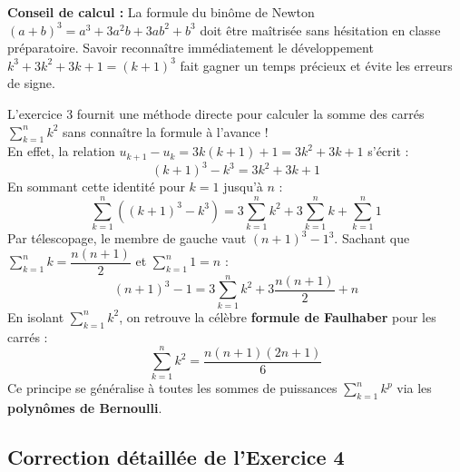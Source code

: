 \documentclass[11pt,a4paper]{article}
\begin{document}
\begin{vigilancebox}
\textbf{Conseil de calcul :} La formule du binôme de Newton $(a+b)^3 = a^3 + 3a^2b + 3ab^2 + b^3$ doit être maîtrisée sans hésitation en classe préparatoire. Savoir reconnaître immédiatement le développement $k^3 + 3k^2 + 3k + 1 = (k+1)^3$ fait gagner un temps précieux et évite les erreurs de signe.
\end{vigilancebox}

\begin{prolongementbox}
L'exercice 3 fournit une méthode directe pour calculer la somme des carrés $\sum_{k=1}^n k^2$ sans connaître la formule à l'avance !\\
En effet, la relation $u_{k+1} - u_k = 3k(k+1) + 1 = 3k^2 + 3k + 1$ s'écrit :
\[
(k+1)^3 - k^3 = 3k^2 + 3k + 1
\]
En sommant cette identité pour $k = 1$ jusqu'à $n$ :
\[
\sum_{k=1}^n \left( (k+1)^3 - k^3 \right) = 3 \sum_{k=1}^n k^2 + 3 \sum_{k=1}^n k + \sum_{k=1}^n 1
\]
Par télescopage, le membre de gauche vaut $(n+1)^3 - 1^3$. Sachant que $\sum_{k=1}^n k = \dfrac{n(n+1)}{2}$ et $\sum_{k=1}^n 1 = n$ :
\[
(n+1)^3 - 1 = 3 \sum_{k=1}^n k^2 + 3 \frac{n(n+1)}{2} + n
\]
En isolant $\sum_{k=1}^n k^2$, on retrouve la célèbre \textbf{formule de Faulhaber} pour les carrés :
\[
\sum_{k=1}^n k^2 = \frac{n(n+1)(2n+1)}{6}
\]
Ce principe se généralise à toutes les sommes de puissances $\sum_{k=1}^n k^p$ via les \textbf{polynômes de Bernoulli}.
\end{prolongementbox}

\vspace{0.3cm}

\subsection*{Correction détaillée de l'Exercice 4}
\end{document}
